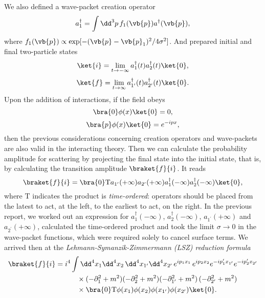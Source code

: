 We also defined a wave-packet creation operator
\begin{equation}
    a_1^\dagger=\int\dd^3p\,f_1(\vb{p})a^\dagger(\vb{p}),
\end{equation}
where $f_1(\vb{p})\propto\exp[-(\vb{p}-\vb{p}_1)^2/4\sigma^2]$. And prepared initial and final two-particle states
\begin{equation}
\ket{i}=\lim_{t\to-\infty}a_1^\dagger(t)a_2^\dagger(t)\ket{0},
\label{2initial_state}
\end{equation}
\begin{equation}
\ket{f}=\lim_{t\to\infty}a_{1^\prime}^\dagger(t)a_{2^\prime}^\dagger(t)\ket{0}.
\label{2final_state}
\end{equation}
Upon the addition of interactions, if the field obeys 
\begin{equation}
    \bra{0}\phi(x)\ket{0}=0,
    \label{condicao1}
\end{equation}
\begin{equation}
    \bra{p}\phi(x)\ket{0}=e^{-ipx},
    \label{condicao2}
\end{equation}
then the previous considerations concerning creation operators and wave-packets are also valid in the interacting theory. Then we can calculate the probability amplitude for scattering by projecting the final state into the initial state, that is,  by calculating the transition amplitude $\braket{f}{i}$. It reads
\begin{equation}
    \braket{f}{i}=\bra{0}\text{T}a_{1^\prime}(+\infty)a_{2^\prime}(+\infty)a_1^\dagger(-\infty)a_2^\dagger(-\infty)\ket{0},
    \label{fi2}
\end{equation}
where $\text{T}$ indicates the product is \textit{time-ordered}: operators should be placed from the latest to act, at the left, to the earliest to act, on the right. In the previous report, we worked out an expression for $a^\dagger_1(-\infty)$, $a^\dagger_2(-\infty)$, $a_{1^\prime}(+\infty)$ and $a_{2^\prime}(+\infty)$,  calculated the time-ordered product and took the limit $\sigma\to0$ in the wave-packet functions, which were required solely to cancel surface terms. We arrived then at the \textit{Lehmann-Symanzik-Zimmermann (LSZ) reduction formula}
\begin{equation}
    \begin{aligned}
    \braket{f}{i}&=i^4\int\dd^4x_1\dd^4x_2\,\dd^4x_{1^\prime}\dd^4x_{2^\prime}\,e^{ip_1x_1}\,e^{ip_2x_2}e^{-ip_{1}^\prime x_{1^\prime}}e^{-ip_{2}^\prime x_{2^\prime}}\\&\qquad\quad\times(-\partial_1^2+m^2)(-\partial_2^2+m^2)
    (-\partial_{1^\prime}^2+m^2)\,(-\partial_{2^\prime}^2+m^2)\\&\qquad\quad\times\bra{0}\text{T}\phi(x_1)\phi(x_2)\phi(x_{1^\prime})\phi(x_{2^\prime})\ket{0}
    \label{2lsz}.
\end{aligned}
\end{equation}
